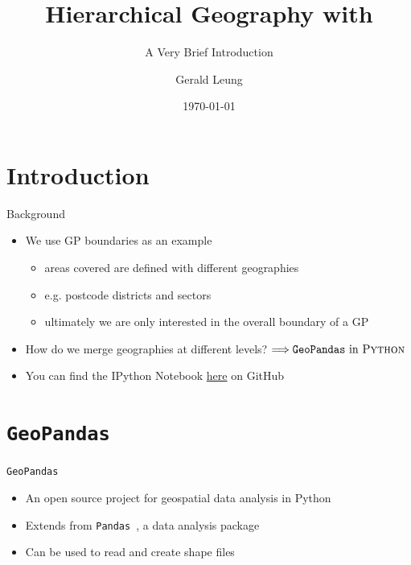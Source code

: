 \documentclass[hyperref={breaklinks,colorlinks,
   urlcolor=blue,citecolor=blue,linkcolor=red}]{beamer}
\title[Hierarchical Geography]
{Hierarchical Geography with \Python}
\subtitle{A Very Brief Introduction}
\author[Gerald Leung]{Gerald Leung\inst{1}} %
\institute[PHS Geospatial]{\inst{1}Public Health Scotland\\
\texttt{gerald.leung@phs.scot}}%
\date[\today]{\today}
\newcommand{\IPython}{{\sc IPython}\xspace}
\newcommand{\Python}{{\sc Python}\xspace}
\begin{document}
{
\begin{frame}
\titlepage
\end{frame}
}



\section{Introduction}

\begin{frame}{Background}
\begin{itemize}
\item{We use GP boundaries as an example}
\begin{itemize}
\item{areas covered are defined with different geographies}
\item{e.g. postcode districts and sectors}
\item{ultimately we are only interested in the overall boundary of a GP}
\end{itemize}
\item{How do we merge geographies at different levels?}
$\Longrightarrow \textrm{\texttt{GeoPandas} in \Python}$
\item{You can find the \IPython Notebook \href{https://github.com/Gerald-Leung/GP_Boundaries/blob/main/Geographies\%20.ipynb}{here} on GitHub}
\end{itemize}
\end{frame}

\section{\texttt{GeoPandas}}
\begin{frame}{\texttt{GeoPandas}}
\begin{itemize}
\item{An open source project for geospatial data analysis in \Python~\citep{kelsey_jordahl_2020_3946761}}
\item{Extends from \texttt{Pandas}~\citep{pandas},
a data analysis package}
\item{Can be used to read and create shape files}
\end{itemize}
\end{frame}
\end{document}
